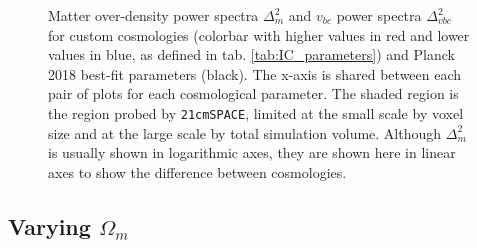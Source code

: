\documentclass[floats,floatfix,showpacs,amssymb,prd,superscriptaddress,nofootinbib]{revtex4-2} %
\newcommand{\code}{\texttt}
\begin{document}
\begin{figure}[H]
\begin{subfigure}[b]{0.9\textwidth}
     \end{subfigure}
        \caption{Matter over-density power spectra $\Delta_m^2$ and $v_{bc}$ power spectra $\Delta_{vbc}^2$ for custom cosmologies (colorbar with higher values in red and lower values in blue, as defined in tab. \ref{tab:IC_parameters}) and Planck 2018 best-fit parameters (black). The x-axis is shared between each pair of plots for each cosmological parameter. The shaded region is the region probed by \code{21cmSPACE}, limited at the small scale by voxel size and at the large scale by total simulation volume. Although $\Delta_m^2$ is usually shown in logarithmic axes, they are shown here in linear axes to show the difference between cosmologies.}
        \label{fig:averaged_IC_power_spectra}
\end{figure}


\subsection{Varying $\Omega_m$}
\end{document}
